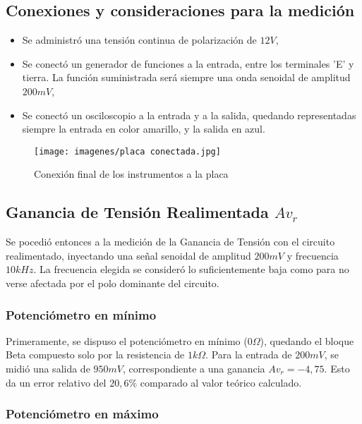 \documentclass[letterpaper, 10 pt, conference]{ieeeconf}  %
\begin{document}
\subsection{\textbf{Conexiones y consideraciones para la medición}}

\begin{itemize}
  \item Se administró una tensión continua de polarización de $12V$,
  \item Se conectó un generador de funciones a la entrada, entre los terminales 'E' y tierra. La función suministrada será siempre una onda senoidal de amplitud $200mV$,
  \item Se conectó un osciloscopio a la entrada y a la salida, quedando representadas siempre la entrada en color amarillo, y la salida en azul.
\end{itemize}

\begin{figure}[H]
  \centering
  \texttt{[image: imagenes/placa conectada.jpg]}
  \caption{Conexión final de los instrumentos a la placa}
  \label{fig:placaconectada}
\end{figure}

\subsection{\textbf{Ganancia de Tensión Realimentada $Av_r$}}

Se pocedió entonces a la medición de la Ganancia de Tensión con el circuito realimentado, inyectando una señal senoidal de amplitud $200mV$ y frecuencia $10kHz$.
La frecuencia elegida se consideró lo suficientemente baja como para no verse afectada por el polo dominante del circuito.\\

\subsubsection{Potenciómetro en mínimo}

Primeramente, se dispuso el potenciómetro en mínimo ($0\Omega$), quedando el bloque Beta compuesto solo por la resistencia de $1k\Omega$.
Para la entrada de $200mV$, se midió una salida de $950mV$, correspondiente a una ganancia $Av_r = -4,75$. Esto da un error relativo del $20,6\%$ comparado al valor teórico calculado.\\[em]

\subsubsection{Potenciómetro en máximo}
\end{document}
